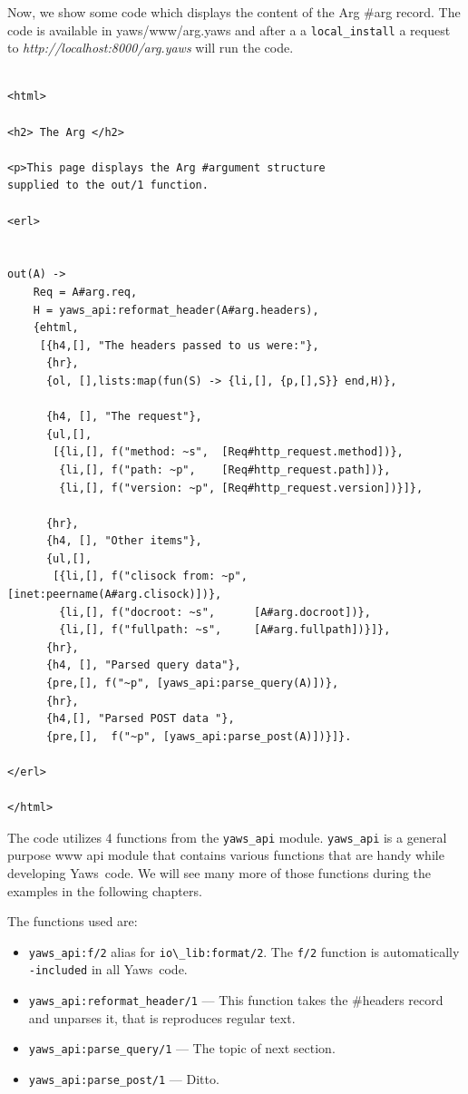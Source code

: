 \documentclass[11pt,oneside,english]{book}
\newcommand{\Yaws}            %
        {{\sc Yaws}}
\begin{document}
Now, we show some code which displays the content of the Arg \#arg record.
The code is available in yaws/www/arg.yaws and after a a \verb+local_install+
a request to \textit{http://localhost:8000/arg.yaws} will run the code.

\begin{verbatim}

<html>

<h2> The Arg </h2>

<p>This page displays the Arg #argument structure
supplied to the out/1 function.

<erl>


out(A) ->
    Req = A#arg.req,
    H = yaws_api:reformat_header(A#arg.headers),
    {ehtml,
     [{h4,[], "The headers passed to us were:"},
      {hr},
      {ol, [],lists:map(fun(S) -> {li,[], {p,[],S}} end,H)},

      {h4, [], "The request"},
      {ul,[],
       [{li,[], f("method: ~s",  [Req#http_request.method])},
        {li,[], f("path: ~p",    [Req#http_request.path])},
        {li,[], f("version: ~p", [Req#http_request.version])}]},

      {hr},
      {h4, [], "Other items"},
      {ul,[],
       [{li,[], f("clisock from: ~p", [inet:peername(A#arg.clisock)])},
        {li,[], f("docroot: ~s",      [A#arg.docroot])},
        {li,[], f("fullpath: ~s",     [A#arg.fullpath])}]},
      {hr},
      {h4, [], "Parsed query data"},
      {pre,[], f("~p", [yaws_api:parse_query(A)])},
      {hr},
      {h4,[], "Parsed POST data "},
      {pre,[],  f("~p", [yaws_api:parse_post(A)])}]}.

</erl>

</html>

\end{verbatim}


The code utilizes 4 functions from the \verb+yaws_api+ module.
\verb+yaws_api+ is a general purpose www api module that contains various
functions that are handy while developing \Yaws\  code. We will see many
more of those functions during the examples in the following chapters.

The functions used are:
\begin{itemize}
\item \verb+yaws_api:f/2+ alias for \verb+io\_lib:format/2+. The
  \verb+f/2+ function is automatically \verb+-included+ in all
  \Yaws\  code.
\item \verb+yaws_api:reformat_header/1+ --- This function takes the \#headers record
and unparses it, that is reproduces regular text.
\item \verb+yaws_api:parse_query/1+ --- The topic of next section.
\item \verb+yaws_api:parse_post/1+ --- Ditto.
\end{itemize}
\end{document}
